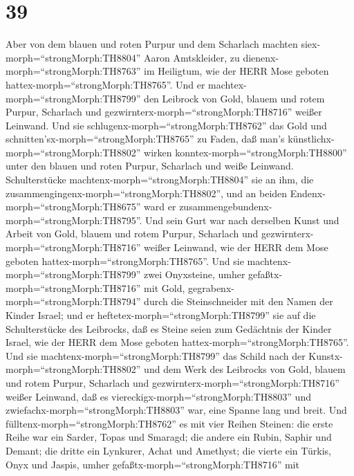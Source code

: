 \hypertarget{section-38}{%
\section{39}\label{section-38}}

 Aber von dem blauen und roten Purpur und dem Scharlach
machten siex-morph=``strongMorph:TH8804'' Aaron Amtskleider, zu
dienenx-morph=``strongMorph:TH8763'' im Heiligtum, wie der HERR Mose
geboten hattex-morph=``strongMorph:TH8765''.  Und er
machtex-morph=``strongMorph:TH8799'' den Leibrock von Gold, blauem und
rotem Purpur, Scharlach und gezwirnterx-morph=``strongMorph:TH8716''
weißer Leinwand.  Und sie
schlugenx-morph=``strongMorph:TH8762'' das Gold und
schnitten'sx-morph=``strongMorph:TH8765'' zu Faden, daß man's
künstlichx-morph=``strongMorph:TH8802'' wirken
konntex-morph=``strongMorph:TH8800'' unter den blauen und roten Purpur,
Scharlach und weiße Leinwand.  Schulterstücke
machtenx-morph=``strongMorph:TH8804'' sie an ihm, die
zusammengingenx-morph=``strongMorph:TH8802'', und an beiden
Endenx-morph=``strongMorph:TH8675'' ward er
zusammengebundenx-morph=``strongMorph:TH8795''.  Und sein
Gurt war nach derselben Kunst und Arbeit von Gold, blauem und rotem
Purpur, Scharlach und gezwirnterx-morph=``strongMorph:TH8716'' weißer
Leinwand, wie der HERR dem Mose geboten
hattex-morph=``strongMorph:TH8765''.  Und sie
machtenx-morph=``strongMorph:TH8799'' zwei Onyxsteine, umher
gefaßtx-morph=``strongMorph:TH8716'' mit Gold,
gegrabenx-morph=``strongMorph:TH8794'' durch die Steinschneider mit den
Namen der Kinder Israel;  und er
heftetex-morph=``strongMorph:TH8799'' sie auf die Schulterstücke des
Leibrocks, daß es Steine seien zum Gedächtnis der Kinder Israel, wie der
HERR dem Mose geboten hattex-morph=``strongMorph:TH8765''. 
Und sie machtenx-morph=``strongMorph:TH8799'' das Schild nach der
Kunstx-morph=``strongMorph:TH8802'' und dem Werk des Leibrocks von Gold,
blauem und rotem Purpur, Scharlach und
gezwirnterx-morph=``strongMorph:TH8716'' weißer Leinwand, 
daß es viereckigx-morph=``strongMorph:TH8803'' und
zwiefachx-morph=``strongMorph:TH8803'' war, eine Spanne lang und breit.
 Und fülltenx-morph=``strongMorph:TH8762'' es mit vier
Reihen Steinen: die erste Reihe war ein Sarder, Topas und Smaragd;
 die andere ein Rubin, Saphir und Demant;  die
dritte ein Lynkurer, Achat und Amethyst;  die vierte ein
Türkis, Onyx und Jaspis, umher gefaßtx-morph=``strongMorph:TH8716'' mit
